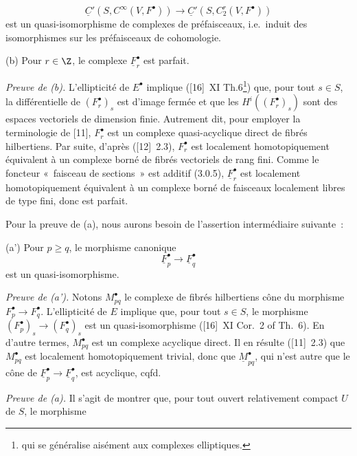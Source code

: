 \[
  \underline C'(S,C^\infty(V,F^\bullet))
  \longrightarrow \underline C'(S,C_2^r(V,F^\bullet))
\]
est un
quasi-isomorphisme de complexes de préfaisceaux, i.e.\ induit des isomorphismes sur les préfaisceaux de cohomologie.

(b) Pour $r\in\Z$, le complexe $\underline F_r^\bullet$ est parfait.

\emph{Preuve de (b).} L'ellipticité de $E^\bullet$ implique ([16]~XI Th.6\footnote{qui se généralise aisément aux complexes elliptiques.}) que, pour tout $s\in S$, la différentielle de $(F_r^\bullet)_s$ est d'image fermée et que les $H^i((F_r^\bullet)_s)$ sont des espaces vectoriels de dimension finie. Autrement dit, pour employer la terminologie de [11], $F_r^\bullet$ est un complexe quasi-acyclique direct de fibrés hilbertiens. Par suite, d'après ([12]~2.3), $F_r^\bullet$ est localement homotopiquement équivalent à un complexe borné de fibrés vectoriels de rang fini. Comme le foncteur «~faisceau de sections~» est additif (3.0.5), $\underline F_r^\bullet$ est localement homotopiquement équivalent à un complexe borné de faisceaux localement libres de type fini, donc est parfait.

Pour la preuve de (a), nous aurons besoin de l'assertion intermédiaire suivante~:

(a') Pour $p\geq q$, le morphisme canonique
\[
  \underline F_p^\bullet\longrightarrow \underline F_q^\bullet
\]
est un quasi-isomorphisme.

\emph{Preuve de (a').} Notons $M_{pq}^\bullet$ le complexe de fibrés hilbertiens cône du morphisme $F_p^\bullet\longrightarrow F_q^\bullet$. L'ellipticité de $E$ implique que, pour tout $s\in S$, le morphisme $(F_p^\bullet)_s\longrightarrow (F_q^\bullet)_s$ est un quasi-isomorphisme ([16]~XI Cor.~2 of Th.~6). En d'autre termes, $M_{pq}^\bullet$ est un complexe acyclique direct. Il en résulte ([11]~2.3) que $M_{pq}^\bullet$ est localement homotopiquement trivial, donc que $\underline M_{pq}^\bullet$, qui n'est autre que le cône de $\underline F_p^\bullet\longrightarrow\underline F_q^\bullet$, est acyclique, cqfd.

\emph{Preuve de (a).} Il s'agit de montrer que, pour tout ouvert relativement compact $U$ de $S$, le morphisme
